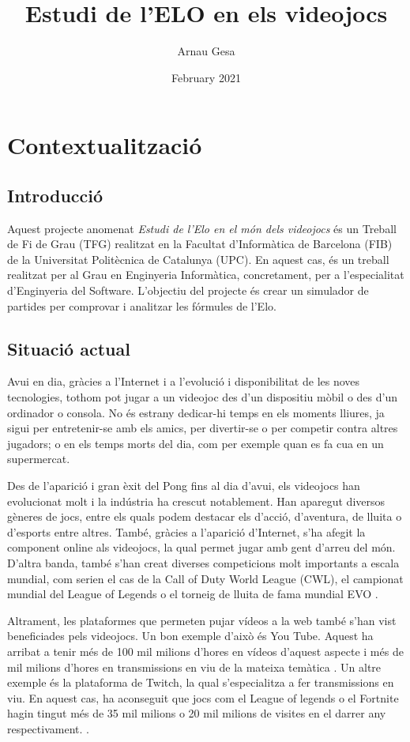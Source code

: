 \documentclass[a4paper]{article}
\title{Estudi de l'ELO en els videojocs}
\author{Arnau Gesa }
\date{February 2021}
\begin{document}


\newpage

\setcounter{page}{1}

\tableofcontents

\newpage
\justify
\section{Contextualització}
\subsection{Introducció}
Aquest projecte anomenat \textit{Estudi de l'Elo en el món dels videojocs} és un Treball de Fi de Grau (TFG) realitzat en la Facultat d'Informàtica de Barcelona (FIB) de la Universitat Politècnica de Catalunya (UPC). En aquest cas, és un treball realitzat per al Grau en Enginyeria Informàtica, concretament, per a l'especialitat d'Enginyeria del Software. L'objectiu del projecte és crear un simulador de partides per comprovar i analitzar les fórmules de l'Elo.

\subsection{Situació actual}
Avui en dia, gràcies a l'Internet i a l'evolució i disponibilitat de les noves tecnologies, tothom pot jugar a un videojoc des d'un dispositiu mòbil o des d'un ordinador o consola. No és estrany dedicar-hi temps en els moments lliures, ja sigui per entretenir-se amb els amics, per divertir-se o per competir contra altres jugadors; o en els temps morts del dia, com per exemple quan es fa cua en un supermercat. 

Des de l'aparició i gran èxit del Pong fins al dia d'avui, els videojocs han evolucionat molt i la indústria ha crescut notablement. Han aparegut diversos gèneres de jocs, entre els quals podem destacar els d'acció, d'aventura, de lluita o d'esports entre altres. També, gràcies a l'aparició d'Internet, s'ha afegit la component online als videojocs, la qual permet jugar amb gent d'arreu del món. D'altra banda, també s'han creat diverses competicions molt importants a escala mundial, com serien el cas de la Call of Duty World League (CWL), el campionat mundial del League of Legends \cite{importantCompetitions}  o el torneig de lluita de fama mundial EVO \cite{wikipediaEVO}.

Altrament, les plataformes que permeten pujar vídeos a la web també \mbox{s'han} vist beneficiades pels videojocs. Un bon exemple d'això és You Tube. Aquest ha arribat a tenir més de 100 mil milions d'hores en vídeos d'aquest aspecte i més de mil milions d'hores en transmissions en viu de la mateixa temàtica \cite{visitesYT}. Un altre exemple és la plataforma de Twitch, la qual s'especialitza a fer transmissions en viu. En aquest cas, ha aconseguit que jocs com el League of legends o el Fortnite hagin tingut més de 35 mil milions o 20 mil milions de visites en el darrer any respectivament. \cite{visitesTwitch}.
\end{document}
